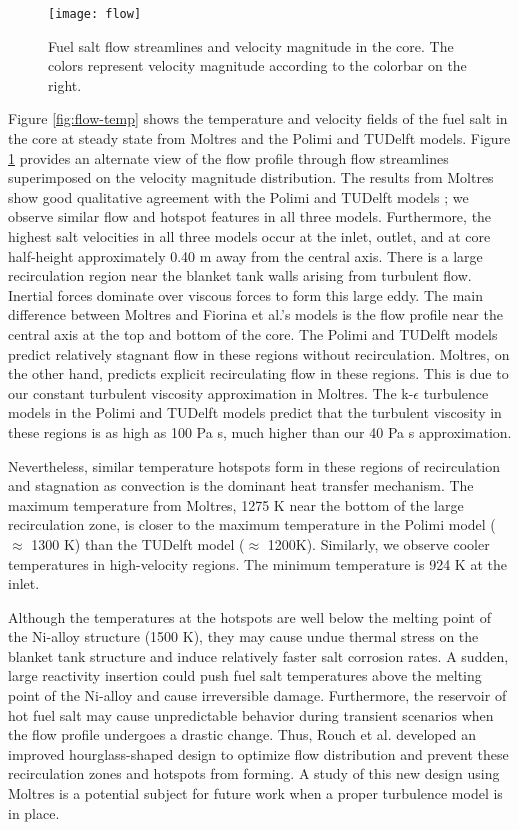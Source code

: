 \begin{figure}[t!]
    \centering
    \texttt{[image: flow]}
    \caption{Fuel salt flow streamlines and velocity magnitude in the core.
    The colors represent velocity magnitude according to the colorbar on the
    right.}
    \label{fig:flow}
\end{figure}

Figure \ref{fig:flow-temp} shows the temperature and velocity fields of the
fuel salt in the core at steady state from Moltres and the Polimi and TUDelft
models. Figure \ref{fig:flow} provides an alternate view of the flow profile
through flow streamlines superimposed on the velocity magnitude distribution.
The results from Moltres show good qualitative agreement with the
Polimi and TUDelft models \cite{fiorina_modelling_2014}; we observe similar
flow and hotspot features in all three models. Furthermore, the highest salt
velocities in all three models occur at the inlet, outlet, and at core
half-height approximately 0.40 m away from the central axis. There is a large
recirculation region near the blanket tank walls arising from turbulent flow.
Inertial forces dominate over viscous forces to form this large eddy. The main
difference between Moltres and Fiorina et al.'s models is the flow profile
near the central axis at the top and bottom of the core.
The Polimi and TUDelft models predict relatively stagnant flow in these
regions without recirculation. Moltres, on the other hand, predicts explicit
recirculating flow in these regions. This is due to our constant turbulent
viscosity approximation in Moltres. The k-$\epsilon$ turbulence models in the
Polimi and TUDelft models predict that the turbulent viscosity in these
regions is as high as 100 Pa s, much higher than our 40 Pa s approximation.

Nevertheless, similar temperature hotspots form in these regions of
recirculation and stagnation as convection is the dominant heat transfer
mechanism. The maximum temperature from Moltres, 1275 K near the bottom of the
large recirculation zone, is closer to the maximum temperature in the Polimi
model ($\approx$ 1300 K) than the TUDelft model ($\approx$ 1200K). Similarly,
we observe cooler temperatures in high-velocity regions. The minimum
temperature is 924 K at the inlet. 

Although the temperatures at the hotspots are well below the melting point of the Ni-alloy structure (1500 K), they may cause undue thermal stress on the
blanket tank structure and induce relatively faster salt corrosion rates. A
sudden, large reactivity insertion could push fuel salt temperatures above the
melting point of the Ni-alloy and cause irreversible damage. Furthermore,
the reservoir of hot fuel salt may cause unpredictable behavior during
transient scenarios when the flow profile undergoes a drastic change.
Thus, Rouch et al. \cite{rouch_preliminary_2014} developed an improved
hourglass-shaped design to optimize flow distribution and prevent these
recirculation zones and hotspots from forming. A study of this new design
using Moltres is a potential subject for future work when a proper turbulence
model is in place.

